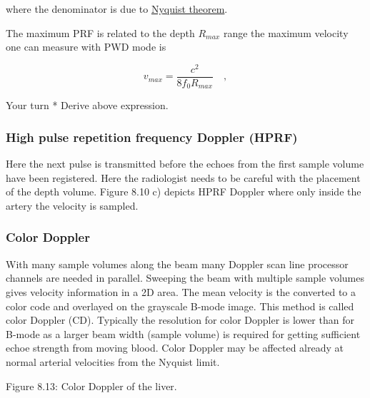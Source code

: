 \documentclass{article}
\begin{document}
where the denominator is due to
\href{https://en.wikipedia.org/wiki/Nyquist–Shannon_sampling_theorem}{Nyquist
theorem}.

The maximum PRF is related to the depth \(R_{max}\) range the maximum
velocity one can measure with PWD mode is

\begin{equation}
v_{max}=\frac{c^2}{8 f_0 R_{max}} \quad ,
\end{equation}

Your turn * Derive above expression.

\subsubsection{High pulse repetition frequency Doppler
(HPRF)}\label{high-pulse-repetition-frequency-doppler-hprf}

Here the next pulse is transmitted before the echoes from the first
sample volume have been registered. Here the radiologist needs to be
careful with the placement of the depth volume. Figure 8.10 c) depicts
HPRF Doppler where only inside the artery the velocity is sampled.

\subsubsection{Color Doppler}\label{color-doppler}

With many sample volumes along the beam many Doppler scan line processor
channels are needed in parallel. Sweeping the beam with multiple sample
volumes gives velocity information in a 2D area. The mean velocity is
the converted to a color code and overlayed on the grayscale B-mode
image. This method is called color Doppler (CD). Typically the
resolution for color Doppler is lower than for B-mode as a larger beam
width (sample volume) is required for getting sufficient echoe strength
from moving blood. Color Doppler may be affected already at normal
arterial velocities from the Nyquist limit.

Figure 8.13: Color Doppler of the liver.


    
    
    
    
\end{document}
